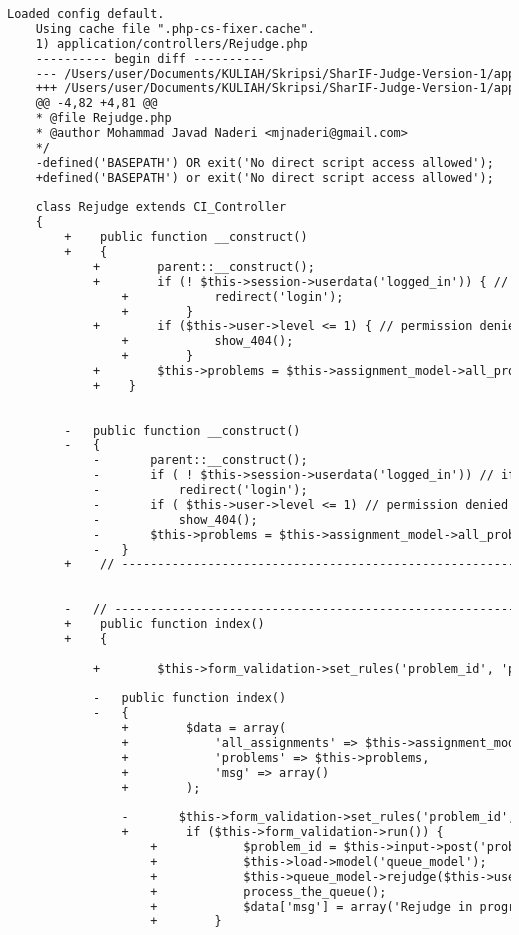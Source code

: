 \begin{lstlisting}[language=diff, caption=Perubahan pada kode Rejudge.php]
	Loaded config default.
	Using cache file ".php-cs-fixer.cache".
	1) application/controllers/Rejudge.php
	---------- begin diff ----------
	--- /Users/user/Documents/KULIAH/Skripsi/SharIF-Judge-Version-1/application/controllers/Rejudge.php
	+++ /Users/user/Documents/KULIAH/Skripsi/SharIF-Judge-Version-1/application/controllers/Rejudge.php
	@@ -4,82 +4,81 @@
	* @file Rejudge.php
	* @author Mohammad Javad Naderi <mjnaderi@gmail.com>
	*/
	-defined('BASEPATH') OR exit('No direct script access allowed');
	+defined('BASEPATH') or exit('No direct script access allowed');
	
	class Rejudge extends CI_Controller
	{
		+    public function __construct()
		+    {
			+        parent::__construct();
			+        if (! $this->session->userdata('logged_in')) { // if not logged in
				+            redirect('login');
				+        }
			+        if ($this->user->level <= 1) { // permission denied
				+            show_404();
				+        }
			+        $this->problems = $this->assignment_model->all_problems($this->user->selected_assignment['id']);
			+    }
		
		
		-	public function __construct()
		-	{
			-		parent::__construct();
			-		if ( ! $this->session->userdata('logged_in')) // if not logged in
			-			redirect('login');
			-		if ( $this->user->level <= 1) // permission denied
			-			show_404();
			-		$this->problems = $this->assignment_model->all_problems($this->user->selected_assignment['id']);
			-	}
		+    // ------------------------------------------------------------------------
		
		
		-	// ------------------------------------------------------------------------
		+    public function index()
		+    {
			
			+        $this->form_validation->set_rules('problem_id', 'problem id', 'required|integer');
			
			-	public function index()
			-	{
				+        $data = array(
				+            'all_assignments' => $this->assignment_model->all_assignments(),
				+            'problems' => $this->problems,
				+            'msg' => array()
				+        );
				
				-		$this->form_validation->set_rules('problem_id', 'problem id', 'required|integer');
				+        if ($this->form_validation->run()) {
					+            $problem_id = $this->input->post('problem_id');
					+            $this->load->model('queue_model');
					+            $this->queue_model->rejudge($this->user->selected_assignment['id'], $problem_id);
					+            process_the_queue();
					+            $data['msg'] = array('Rejudge in progress');
					+        }
				

\end{lstlisting}
